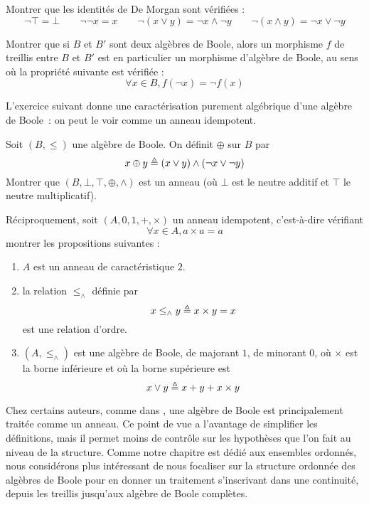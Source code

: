 \begin{exercise}
  Montrer que les identités de De Morgan sont vérifiées :
  \[\lnot \top = \bot \qquad \lnot\lnot x = x
  \qquad \lnot (x \lor y) = \lnot x \land \lnot y
  \qquad \lnot (x \land y) = \lnot x \lor \lnot y\]
\end{exercise}

\begin{exercise}
  Montrer que si $B$ et $B'$ sont deux algèbres de Boole, alors un morphisme $f$
  de treillis entre $B$ et $B'$ est en particulier un morphisme d'algèbre de
  Boole, au sens où la propriété suivante est vérifiée :
  \[\forall x \in B, f(\lnot x) = \lnot f(x)\]
\end{exercise}

L'exercice suivant donne une caractérisation purement algébrique d'une algèbre
de Boole~: on peut le voir comme un anneau idempotent.

\begin{exercise}
  Soit $(B,\leq)$ une algèbre de Boole. On définit $\oplus$ sur $B$ par
  \[x\oplus y \triangleq (x\lor y) \land (\lnot x \lor \lnot y)\]
  Montrer que $(B,\bot,\top,\oplus,\land)$ est un anneau (où $\bot$ est le
  neutre additif et $\top$ le neutre multiplicatif).

  Réciproquement, soit $(A,0,1,+,\times)$ un anneau idempotent, c'est-à-dire
  vérifiant
  \[\forall x\in A, a\times a = a\]
  montrer les propositions suivantes :
  \begin{enumerate}[label=(\roman*)]
  \item $A$ est un anneau de caractéristique $2$.
  \item la relation $\leq_\land$ définie par
    \[x\leq_\land y \triangleq x\times y = x\]
    est une relation d'ordre.
  \item $(A,\leq_\land)$ est une algèbre de Boole, de majorant $1$, de minorant
    $0$, où $\times$ est la borne inférieure et où la borne supérieure est
    \[x\lor y \triangleq x + y + x \times y\]
  \end{enumerate}
\end{exercise}

\begin{remark}
  Chez certains auteurs, comme dans \cite{Halmos1966-HALLOB}, une algèbre de
  Boole est principalement traitée comme un anneau. Ce point de vue a
  l'avantage de simplifier les définitions, mais il permet moins de contrôle
  sur les hypothèses que l'on fait au niveau de la structure. Comme notre
  chapitre est dédié aux ensembles ordonnés, nous considérons plus intéressant
  de nous focaliser sur la structure ordonnée des algèbres de Boole pour en
  donner un traitement s'inscrivant dans une continuité, depuis les treillis
  jusqu'aux algèbre de Boole complètes.
\end{remark}

